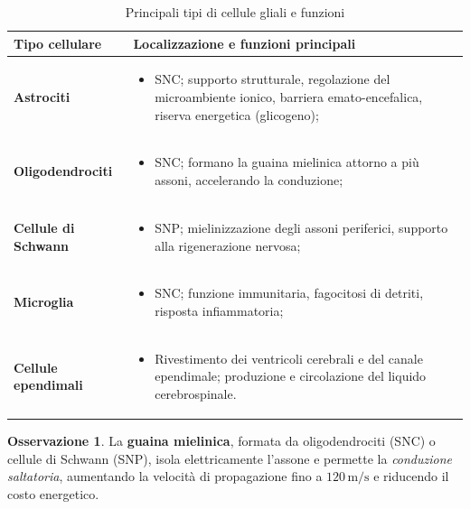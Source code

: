 \documentclass[11pt,a4paper,italian,twoside]{report}
\theoremstyle{definition} %
\newtheorem{remark}{Osservazione}[section]
\begin{document}
\begin{table}[htbp]
  \centering
  \caption{Principali tipi di cellule gliali e funzioni}
  \label{tab:cellule_gliali}
  \begin{tabularx}{\textwidth}{l X}
    \toprule
    \textbf{Tipo cellulare} & \textbf{Localizzazione e funzioni principali} \\
    \midrule
    \textbf{Astrociti} & 
    \begin{itemize}[leftmargin=1.2em,noitemsep,topsep=0pt,partopsep=0pt]
      \item SNC; supporto strutturale, regolazione del microambiente ionico, barriera emato-encefalica, riserva energetica (glicogeno);
    \end{itemize} \\
    \addlinespace
    \textbf{Oligodendrociti} & 
    \begin{itemize}[leftmargin=1.2em,noitemsep,topsep=0pt,partopsep=0pt]
      \item SNC; formano la guaina mielinica attorno a più assoni, accelerando la conduzione;
    \end{itemize} \\
    \addlinespace
    \textbf{Cellule di Schwann} & 
    \begin{itemize}[leftmargin=1.2em,noitemsep,topsep=0pt,partopsep=0pt]
      \item SNP; mielinizzazione degli assoni periferici, supporto alla rigenerazione nervosa;
    \end{itemize} \\
    \addlinespace
    \textbf{Microglia} & 
    \begin{itemize}[leftmargin=1.2em,noitemsep,topsep=0pt,partopsep=0pt]
      \item SNC; funzione immunitaria, fagocitosi di detriti, risposta infiammatoria;
    \end{itemize} \\
    \addlinespace
    \textbf{Cellule ependimali} & 
    \begin{itemize}[leftmargin=1.2em,noitemsep,topsep=0pt,partopsep=0pt]
      \item Rivestimento dei ventricoli cerebrali e del canale ependimale; produzione e circolazione del liquido cerebrospinale.
    \end{itemize} \\
    \bottomrule
  \end{tabularx}
\end{table}

\begin{remark}
La \textbf{guaina mielinica}, formata da oligodendrociti (SNC) o cellule di Schwann (SNP), isola elettricamente l'assone e permette la \textit{conduzione saltatoria}, aumentando la velocità di propagazione fino a $120\,\mathrm{m/s}$ e riducendo il costo energetico.
\end{remark}
\end{document}
